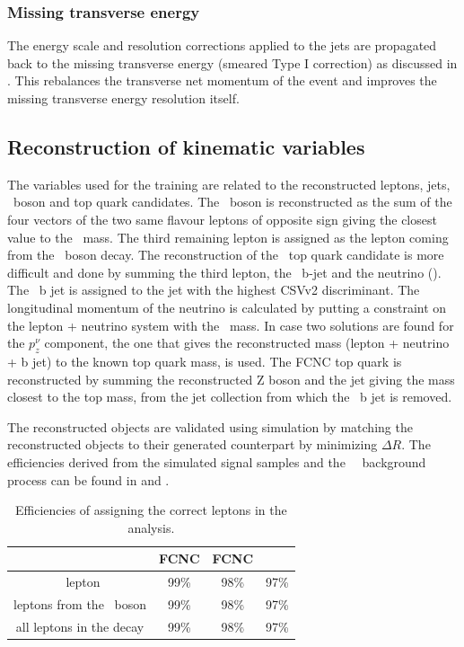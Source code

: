 \subsubsection*{Missing transverse energy}
The energy scale and resolution corrections applied to the jets are propagated back to the  missing transverse energy (smeared Type I correction) as discussed in . This rebalances the transverse net momentum of the event and improves the missing transverse energy resolution itself.

\subsection{Reconstruction of kinematic variables}
The variables used for  the training are related to the reconstructed leptons, jets, \PZ\ boson and top quark candidates. The \PZ\ boson is reconstructed as the sum of the four vectors of the two same flavour leptons of opposite sign giving the closest value to the \PZ\ mass. The third remaining lepton is assigned as the lepton coming from the \PW\ boson decay.
The reconstruction of the \SM\ top quark candidate is more difficult and done by summing the third lepton, the \SM\ b-jet and the neutrino (\Etmis). The \SM\ b jet is assigned to the jet with the highest CSVv2 discriminant. The longitudinal momentum of the neutrino is calculated by putting a constraint on the lepton + neutrino system with the \PW\ mass. In case two solutions are found for the $p_z^{\nu}$ component, the one that gives the reconstructed mass (lepton + neutrino + b jet) to  the known top quark mass, is used. 
The FCNC top quark is reconstructed by summing the reconstructed Z boson and the jet giving the mass closest to the top mass, from the jet collection from which the \SM\ b jet is removed. 

The reconstructed objects are validated using simulation by matching the reconstructed objects to their generated counterpart by minimizing $\Delta R$. The efficiencies derived from the simulated signal samples and the \SM\ \tZq\ background process can be found in  and . 

\begin{table}[htbp]
	\centering
	\caption{Efficiencies of assigning the correct leptons in the analysis.}
	\begin{tabular}{cccc}
		\toprule 
		& FCNC \tZq  & FCNC \tZ & \SM\ \tZq \\ 
		\midrule
		\PW\ lepton & 99\% & 98\% & 97\% \\ 
	
		leptons from the \PZ\ boson  & 99\% & 98\% & 97\% \\ 
		 
		all leptons in the decay & 99\% & 98\% & 97\% \\ 
		\bottomrule
	\end{tabular} 
	\label{tab:matching}
\end{table}


